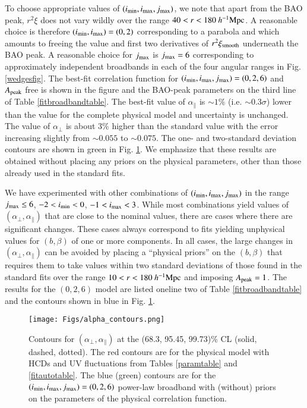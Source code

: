 \documentclass{aa}
\newcommand{\imin}{i_{\rm min}}
\newcommand{\imax}{i_{\rm max}}
\newcommand{\jmax}{j_{\rm max}}
\newcommand{\apar}{\alpha_\parallel}
\newcommand{\aperp}{\alpha_\perp}
\newcommand{\hMpc}{h^{-1}{\rm Mpc}}
\newcommand{\Apeak}{A_{\rm peak}}
\begin{document}
To choose appropriate values of $(\imin,\imax,\jmax)$, we note that
apart from the BAO peak, $r^2\xi$ does not vary wildly
over the range  $40<r<180~\hMpc$. A reasonable choice
is therefore $(\imin,\imax)=(0,2)$ corresponding to a parabola
and which amounts to freeing the
value and first two derivatives of $r^2\xi_{\rm smooth}$ underneath the BAO peak.
A reasonable choice for $\jmax$ is $\jmax=6$ corresponding
to approximately independent broadbands in each of the four angular ranges in
Fig. \ref{wedgesfig}.
The best-fit correlation function for 
$(\imin,\imax,\jmax)=(0,2,6)$ and $\Apeak$ free 
is shown in the figure and the
BAO-peak parameters on the third line of  Table \ref{fitbroadbandtable}.
The best-fit value of $\apar$ is $\sim1\%$ (i.e. $\sim0.3\sigma$)
lower than the 
value for the complete physical model  and uncertainty is unchanged.
The value of $\aperp$ is about 3\% higher
than the standard value with the error increasing slightly
from $\sim0.055$ to $\sim0.075$.
The one- and two-standard deviation contours are shown in green
in Fig. \ref{alphadatafig}. 
We emphasize that these results are obtained without placing
any priors on the physical parameters, other than those already
used in the standard fits.




We have experimented with other combinations of $(\imin,\imax,\jmax)$ in the
range $\jmax\leq 6$, $-2<\imin<0$, $-1<\imax<3$.
While most combinations yield values of  $(\aperp,\apar)$ that
are close to the nominal values, there are
cases where there are significant changes.
These cases always correspond to fits yielding unphysical
values for $(b,\beta)$ of one or more components.
In all cases, the large changes in $(\aperp,\apar)$ can be
avoided by
placing a ``physical priors'' on the $(b,\beta)$ that requires them
to take values within two standard deviations of
those found in the standard fits
over the range $10<r<180~\hMpc$ and imposing $\Apeak=1$.
The results for the $(0,2,6)$ model are
listed oneline two of Table \ref{fitbroadbandtable} and the contours
shown in blue in Fig. \ref{alphadatafig}.



\begin{figure}[tb] 
\texttt{[image: Figs/alpha\_contours.png]}
\caption{
  Contours for $(\aperp,\apar)$ at the (68.3, 95.45, 99.73)\% CL
  (solid, dashed, dotted).
  The red contours are for the physical model with HCDs and UV fluctuations
  from Tables \ref{paramtable} and \ref{fitautotable}.
  The blue (green) contours are for the $(\imin,\imax,\jmax)=(0,2,6)$
  power-law broadband with (without) priors on the 
  parameters of the physical correlation function.
}
\label{alphadatafig}
\end{figure}
\end{document}
